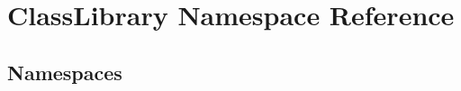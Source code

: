 \hypertarget{namespace_class_library}{}\section{Class\+Library Namespace Reference}
\label{namespace_class_library}
\subsection*{Namespaces}
\begin{DoxyCompactItemize}
\end{DoxyCompactItemize}
